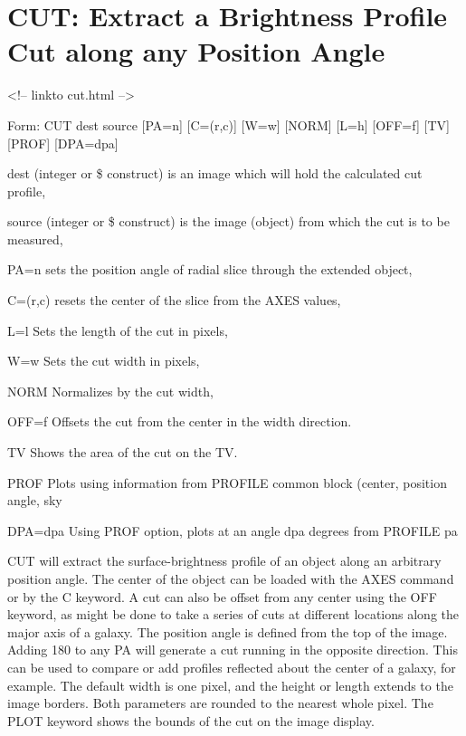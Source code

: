 
\section{CUT: Extract a Brightness Profile Cut along any Position Angle}
\begin{rawhtml}
<!-- linkto cut.html -->
\end{rawhtml}

\begin{command}
  \item[Form: CUT dest source {[PA=n]} {[C=(r,c)]} {[W=w]} {[NORM]} {[L=h]}
       {[OFF=f]} {[TV]} {[PROF]} {[DPA=dpa]} \hfill]{}
  \item[dest]{(integer or \$ construct) is an image which
       will hold the calculated cut profile,}
  \item[source]{(integer or \$ construct) is the image (object)
       from which the cut is to be measured,}
  \item[PA=n]{sets the position angle of radial slice through the 
       extended object,}
  \item[C=(r,c)]{resets the center of the slice from the AXES values,}
  \item[L=l]{Sets the length of the cut in pixels,}
  \item[W=w]{Sets the cut width in pixels,}
  \item[NORM]{Normalizes by the cut width,}
  \item[OFF=f]{Offsets the cut from the center in the width direction.}
  \item[TV]{Shows the area of the cut on the TV.}
  \item[PROF]{Plots using information from PROFILE common block (center, 
        position angle, sky}
  \item[DPA=dpa]{Using PROF option, plots at an angle dpa degrees from
        PROFILE pa}
\end{command}
 
CUT will extract the surface-brightness profile of an object along an
arbitrary position angle.  The center of the object can be loaded with the
AXES command or by the C keyword.  A cut can also be offset from any center
using the OFF keyword, as might be done to take a series of cuts at
different locations along the major axis of a galaxy.  The position angle
is defined from the top of the image.  Adding 180 to any PA will generate a
cut running in the opposite direction.  This can be used to compare or add
profiles reflected about the center of a galaxy, for example.  The default
width is one pixel, and the height or length extends to the image borders.
Both parameters are rounded to the nearest whole pixel. The PLOT keyword
shows the bounds of the cut on the image display.

